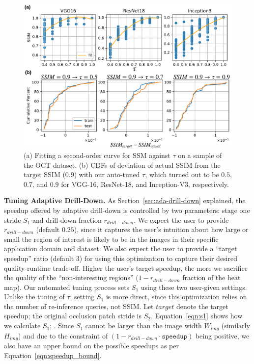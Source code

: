 \begin{figure}[t]
\includegraphics[width=\columnwidth]{images/system_tuning}
\vspace{-8mm}
\caption{(a) Fitting a second-order curve for SSM against $\tau$ on a sample of the OCT dataset. 
(b) CDFs of deviation of actual SSIM from the target SSIM ($0.9$) with our auto-tuned $\tau$, which turned out to be $0.5$, $0.7$, and $0.9$ for VGG-16, ResNet-18, and Inception-V3, respectively.}
\label{fig:system_tuning}
\vspace{-4mm}
\end{figure}

\vspace{2mm}
\noindent \textbf{Tuning Adaptive Drill-Down.}
As Section~\ref{sec:ada-drill-down} explained, the speedup offered by adaptive drill-down is controlled by two parameters: stage one stride $S_1$ and drill-down fraction $r_{\mathit{drill}-\mathit{down}}$. We expect the user to provide $r_{\mathit{drill}-\mathit{down}}$ (default $0.25$), since it captures the user's intuition about how large or small the region of interest is likely to be in the images in their specific application domain and dataset. We also expect the user to provide a ``target speedup'' ratio (default $3$) for using this optimization to capture their desired quality-runtime trade-off. Higher the user's target speedup, the more we sacrifice the quality of the ``non-interesting regions'' ($1 - r_{\mathit{drill}-\mathit{down}}$ fraction of the heat map). Our automated tuning process sets $S_1$ using these two user-given settings. Unlike the tuning of $\tau$, setting $S_1$ is more direct, since this optimization relies on the number of re-inference queries, not SSIM. Let $\mathit{target}$ denote the target speedup; the original occlusion patch stride is $S_2$. Equation~\ref{eqn:s1} shows how we calculate $S_1$; . Since $S_1$ cannot be larger than the image width $W_\mathit{img}$ (similarly $H_\mathit{img}$) and due to the constraint of $(1-r_{\mathit{drill}-\mathit{down}} \cdot \texttt{speedup})$ being positive, we also have an upper bound on the possible speedups as per Equation~\ref{eqn:speedup_bound}.

